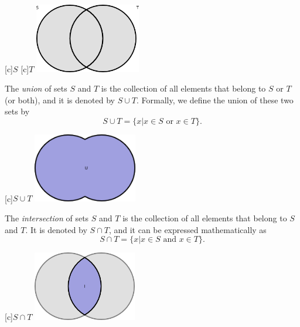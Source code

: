 \begin{center}
\begin{psfrags}
[c]{$S$}
[c]{$T$}
\includegraphics[height=3.03cm]{Figures/1Chapter/sets}
\end{psfrags}
\end{center}

The \emph{union} of sets $S$ and $T$ is the collection of all elements that belong to $S$ or $T$ (or both), and it is denoted by $S \cup T$. 
Formally, we define the union of these two sets by
\begin{equation*}
S \cup T = \{ x | x \in S \text{ or } x \in T \} .
\end{equation*}

\begin{center}
\begin{psfrags}
[c]{$S \cup T$}
\includegraphics[height=3.03cm]{Figures/1Chapter/union}
\end{psfrags}
\end{center}

The \emph{intersection} of sets $S$ and $T$ is the collection of all elements that belong to $S$ and $T$. 
It is denoted by $S \cap T$, and it can be expressed mathematically as
\begin{equation*}
S \cap T = \{ x | x \in S \text{ and } x \in T \} .
\end{equation*}

\begin{center}
\begin{psfrags}
[c]{$S \cap T$}
\includegraphics[height=3.03cm]{Figures/1Chapter/intersection}
\end{psfrags}
\end{center}

